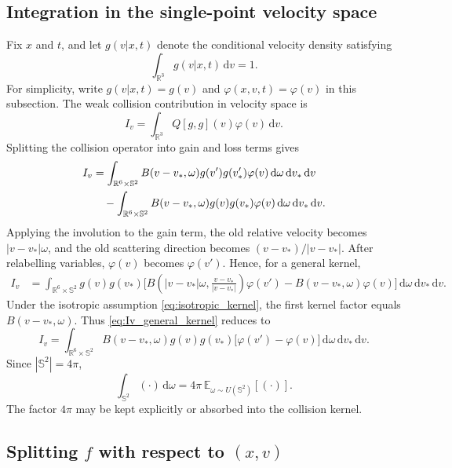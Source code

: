 \documentclass[11pt]{article}
\newcommand{\R}{\mathbb{R}}
\newcommand{\Sph}{\mathbb{S}^{2}}
\newcommand{\dd}{\,\mathrm{d}}
\newcommand{\E}{\mathbb{E}}
\newcommand{\ph}{\varphi}
\theoremstyle{plain}
\begin{document}
\subsection{Integration in the single-point velocity space}

Fix $x$ and $t$, and let $g(v|x,t)$ denote the conditional velocity density satisfying
\[
\int_{\R^3} g(v|x,t)\dd v=1.
\]
For simplicity, write $g(v|x,t)=g(v)$ and $\ph(x,v,t)=\ph(v)$ in this subsection. The weak collision contribution in velocity space is
\begin{equation}
I_v=\int_{\R^3} Q[g,g](v)\ph(v)\dd v.
\label{eq:Iv_def}
\end{equation}
Splitting the collision operator into gain and loss terms gives
\begin{align}
I_v
&=
\int_{\R^6\times\Sph}
B(v-v_*,\omega)g(v')g(v_*')\ph(v)
\dd\omega\dd v_*\dd v
\notag\\
&\quad -
\int_{\R^6\times\Sph}
B(v-v_*,\omega)g(v)g(v_*)\ph(v)
\dd\omega\dd v_*\dd v.
\label{eq:Iv_gain_loss}
\end{align}
Applying the involution to the gain term, the old relative velocity becomes $|v-v_*|\omega$, and the old scattering direction becomes $(v-v_*)/|v-v_*|$. After relabelling variables, $\ph(v)$ becomes $\ph(v')$. Hence, for a general kernel,
\begin{align}
I_v
&=
\int_{\R^6\times\Sph}
g(v)g(v_*)
\Bigg[
B\left(|v-v_*|\omega,\frac{v-v_*}{|v-v_*|}\right)\ph(v')
-
B(v-v_*,\omega)\ph(v)
\Bigg]
\dd\omega\dd v_*\dd v.
\label{eq:Iv_general_kernel}
\end{align}
Under the isotropic assumption \eqref{eq:isotropic_kernel}, the first kernel factor equals $B(v-v_*,\omega)$. Thus \eqref{eq:Iv_general_kernel} reduces to
\begin{equation}
I_v
=
\int_{\R^6\times\Sph}
B(v-v_*,\omega)g(v)g(v_*)
\big[\ph(v')-\ph(v)\big]
\dd\omega\dd v_*\dd v.
\label{eq:Iv_isotropic}
\end{equation}
Since $|\Sph|=4\pi$,
\[
\int_{\Sph}(\cdot)\dd\omega
=
4\pi\,\E_{\omega\sim U(\Sph)}[(\cdot)].
\]
The factor $4\pi$ may be kept explicitly or absorbed into the collision kernel.

\subsection{Splitting $f$ with respect to $(x,v)$}
\end{document}
